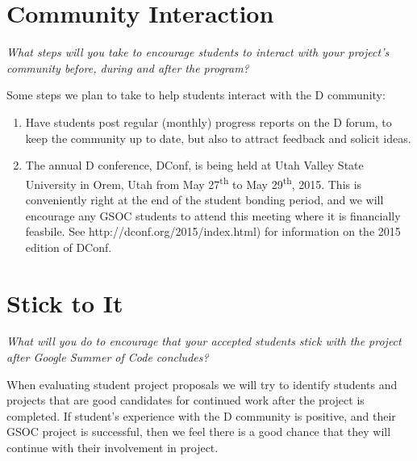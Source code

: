 \documentclass[a4paper,12pt]{article}
\begin{document}
\section{Community Interaction}
\emph{What steps will you take to encourage students to interact 
with your project's community before, during and after 
the program?}

Some steps we plan to take to help students interact with
the D community:

\begin{enumerate}
\item Have students post regular (monthly) progress reports
on the D forum, to keep the community up to date, but also
to attract feedback and solicit ideas.
\item The annual D conference, DConf, is being held at Utah
Valley State University in Orem, Utah from May 27\textsuperscript{th}
to May 29\textsuperscript{th}, 2015. This is conveniently right at 
the end of the student bonding period, and we will encourage any
GSOC students to attend this meeting where it is financially 
feasbile. See http://dconf.org/2015/index.html) for information on 
the 2015 edition of DConf.
\end{enumerate}


\section{Stick to It}

\emph{What will you do to encourage that your accepted students stick 
with the project after Google Summer of Code concludes?}

When evaluating student project proposals we will try to identify
students and projects that are good candidates for continued work
after the project is completed.  If student's experience with the 
D community is positive, and their GSOC project is successful, then
we feel there is a good chance that they will continue with their
involvement in project. 
\end{document}
